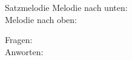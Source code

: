 \begin{phonology}{Satzmelodie}{}
Melodie nach unten: \smd \\
Melodie nach oben: \smu

Fragen: \smu \\
Anworten: \smd
\end{phonology}
